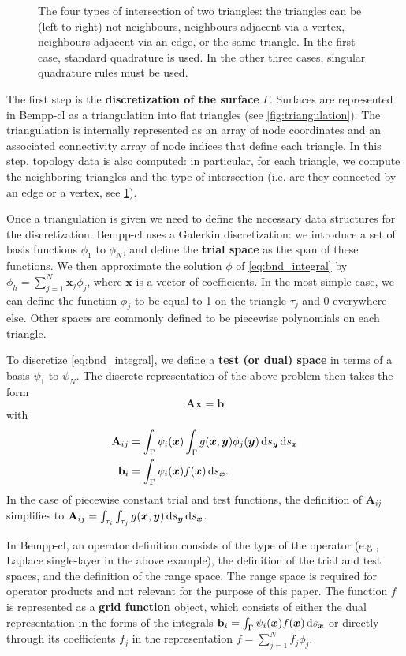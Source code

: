\documentclass{IEEEcsmag}
\newcommand{\bvec}[1]{\boldsymbol{#1}}
\def\bx{\bvec{x}}
\def\by{\bvec{y}}
\newcommand{\ds}[1][]{\,\mathrm{d}s\ifthenelse{\equal{#1}{}}{}{_{#1}}}
\newcommand{\dmat}[1]{\mathbf{#1}}
\newcommand{\dvec}[1]{\mathbf{#1}}
\begin{document}
\begin{figure}
	\centering
	
	\caption{The four types of intersection of two triangles: the triangles can be (left to right) not neighbours, neighbours adjacent via a vertex, neighbours adjacent via an edge, or the same triangle. In the first case, standard quadrature is used. In the other three cases, singular quadrature rules must be used.}
	\label{fig:triangles}
\end{figure}

The first step is the \textbf{discretization of the surface} $\Gamma$. Surfaces are represented in Bempp-cl as a triangulation into flat triangles (see \cref{fig:triangulation}). The triangulation is internally represented as an array of node coordinates and an associated connectivity array of node indices that define each triangle. In this step, topology data is also computed: in particular, for each triangle, we compute the neighboring triangles and the type of intersection (i.e. are they connected by an edge or a vertex, see \cref{fig:triangles}).

Once a triangulation is given we need to define the necessary data structures for the discretization. Bempp-cl uses a Galerkin discretization: we introduce a set of basis functions \(\phi_1\) to \(\phi_N\), and define the \textbf{trial space} as the span of these functions. We then approximate the solution \(\phi\) of \cref{eq:bnd_integral} by $\phi_h=\sum_{j=1}^N \dvec{x}_j\phi_j$, where $\dvec{x}$ is a vector of coefficients. In the most simple case, we can define the function \(\phi_j\) to be equal to 1 on the triangle $\tau_j$ and 0 everywhere else. Other spaces are commonly defined to be piecewise polynomials on each triangle.

To discretize \cref{eq:bnd_integral}, we define a \textbf{test (or dual) space} in terms of a basis \(\psi_1\) to \(\psi_N\). The discrete representation of the above problem then takes the form
$$
\dmat{A}\dvec{x} = \dvec{b}
$$
with
\begin{align*}
	\dmat{A}_{ij} &= \int_{\Gamma}\psi_i(\bx)\int_{\Gamma}g(\bx, \by)\phi_j(\by)\ds[\by]\ds[\bx]\\
	\dvec{b}_i &= \int_{\Gamma}\psi_i(\bx)f(\bx)\ds[\bx].
\end{align*}
In the case of piecewise constant trial and test functions, the definition of $\dmat{A}_{ij}$ simplifies to $\dmat{A}_{ij} = \int_{\tau_i}\int_{\tau_j}g(\bx, \by)\ds[\by]\ds[\bx]$.

In Bempp-cl, an operator definition consists of the type of the operator (e.g., Laplace single-layer in the above example),
the definition of the trial and test spaces, and the definition of the range space. The range space is required for operator
products and not relevant for the purpose of this paper. The function $f$ is represented as a \textbf{grid function} object, which
consists of either the dual representation in the forms of the integrals $\dvec{b}_i = \int_{\Gamma}\psi_i(\bx)f(\bx)\ds[\bx]$ or directly through its coefficients $f_j$ in the representation $f=\sum_{j=1}^N f_j\phi_j$.
\end{document}
